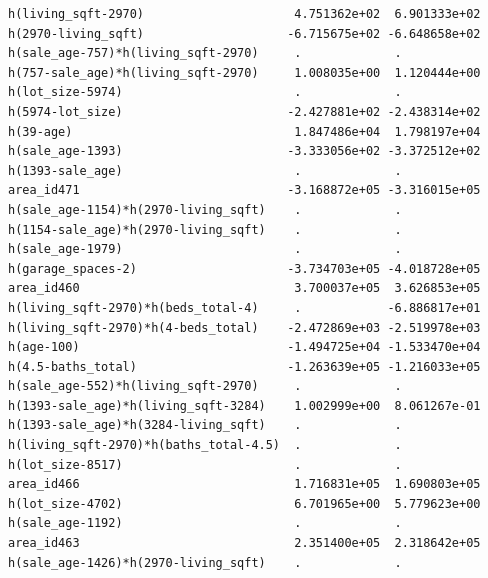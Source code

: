 \documentclass[
]{article}
\begin{document}
\begin{verbatim}
h(living_sqft-2970)                     4.751362e+02  6.901333e+02
h(2970-living_sqft)                    -6.715675e+02 -6.648658e+02
h(sale_age-757)*h(living_sqft-2970)     .             .           
h(757-sale_age)*h(living_sqft-2970)     1.008035e+00  1.120444e+00
h(lot_size-5974)                        .             .           
h(5974-lot_size)                       -2.427881e+02 -2.438314e+02
h(39-age)                               1.847486e+04  1.798197e+04
h(sale_age-1393)                       -3.333056e+02 -3.372512e+02
h(1393-sale_age)                        .             .           
area_id471                             -3.168872e+05 -3.316015e+05
h(sale_age-1154)*h(2970-living_sqft)    .             .           
h(1154-sale_age)*h(2970-living_sqft)    .             .           
h(sale_age-1979)                        .             .           
h(garage_spaces-2)                     -3.734703e+05 -4.018728e+05
area_id460                              3.700037e+05  3.626853e+05
h(living_sqft-2970)*h(beds_total-4)     .            -6.886817e+01
h(living_sqft-2970)*h(4-beds_total)    -2.472869e+03 -2.519978e+03
h(age-100)                             -1.494725e+04 -1.533470e+04
h(4.5-baths_total)                     -1.263639e+05 -1.216033e+05
h(sale_age-552)*h(living_sqft-2970)     .             .           
h(1393-sale_age)*h(living_sqft-3284)    1.002999e+00  8.061267e-01
h(1393-sale_age)*h(3284-living_sqft)    .             .           
h(living_sqft-2970)*h(baths_total-4.5)  .             .           
h(lot_size-8517)                        .             .           
area_id466                              1.716831e+05  1.690803e+05
h(lot_size-4702)                        6.701965e+00  5.779623e+00
h(sale_age-1192)                        .             .           
area_id463                              2.351400e+05  2.318642e+05
h(sale_age-1426)*h(2970-living_sqft)    .             .           
                                                                  

\end{verbatim}
\end{document}
